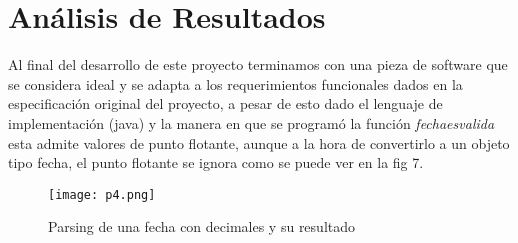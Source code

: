 \documentclass[10pt,journal,compsoc]{IEEEtran}
\begin{document}
\section{Análisis de Resultados}
\par Al final del desarrollo de este proyecto terminamos con una pieza de software que se considera ideal y se adapta a los requerimientos funcionales dados en la especificación original del proyecto, a pesar de esto dado el lenguaje de implementación (java) y la manera en que se programó la función \textit{fecha\textunderscore es\textunderscore valida} esta admite valores de punto flotante, aunque a la hora de convertirlo a un objeto tipo fecha, el punto flotante se ignora como se puede ver en la fig 7.
\begin{figure}[h!]
	\centering
	\texttt{[image: p4.png]}
	\caption{Parsing de una fecha con decimales y su resultado}
\end{figure}	
\end{document}
